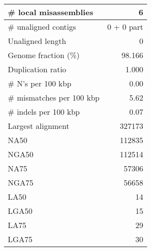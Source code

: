 \documentclass[12pt,a4paper]{article}
\begin{document}
\begin{table}[ht]
\begin{center}
\begin{tabular}{|l*{1}{|r}|}
\# local misassemblies & 6 \\ \hline
\# unaligned contigs & 0 + 0 part \\ \hline
Unaligned length & 0 \\ \hline
Genome fraction (\%) & 98.166 \\ \hline
Duplication ratio & 1.000 \\ \hline
\# N's per 100 kbp & 0.00 \\ \hline
\# mismatches per 100 kbp & 5.62 \\ \hline
\# indels per 100 kbp & 0.07 \\ \hline
Largest alignment & 327173 \\ \hline
NA50 & 112835 \\ \hline
NGA50 & 112514 \\ \hline
NA75 & 57306 \\ \hline
NGA75 & 56658 \\ \hline
LA50 & 14 \\ \hline
LGA50 & 15 \\ \hline
LA75 & 29 \\ \hline
LGA75 & 30 \\ \hline
\end{tabular}
\end{center}
\end{table}
\end{document}
